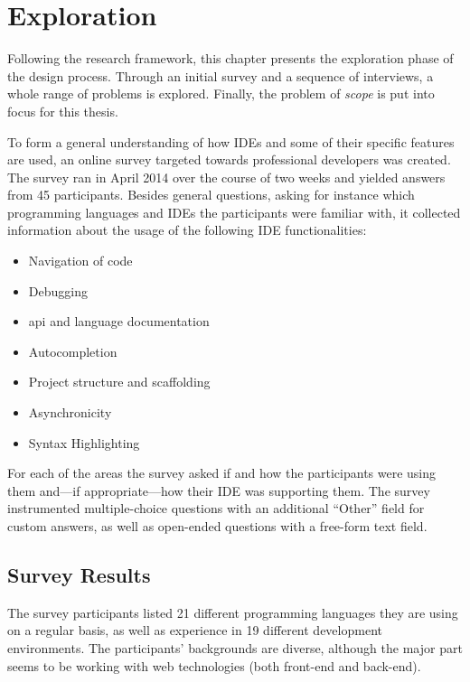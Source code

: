 \chapter{Exploration}\label{exploration}

Following the research framework, this chapter presents the exploration
phase of the design process. Through an initial survey and a sequence of
interviews, a whole range of problems is explored. Finally, the problem
of \emph{scope} is put into focus for this thesis.

To form a general understanding of how IDEs and some of their specific
features are used, an online survey targeted towards professional
developers was created. The survey ran in April 2014 over the course of
two weeks and yielded answers from 45 participants. Besides general
questions, asking for instance which programming languages and IDEs the
participants were familiar with, it collected information about the
usage of the following IDE functionalities:

\begin{itemize}
\itemsep1pt\parskip0pt
\item
  Navigation of code
\item
  Debugging
\item
  \ac{api} and language documentation
\item
  Autocompletion
\item
  Project structure and scaffolding
\item
  Asynchronicity
\item
  Syntax Highlighting
\end{itemize}

For each of the areas the survey asked if and how the participants were
using them and—if appropriate—how their IDE was supporting them. The
survey instrumented multiple-choice questions with an additional “Other”
field for custom answers, as well as open-ended questions with a
free-form text field.

\section{Survey Results}\label{survey-results}

The survey participants listed 21 different programming languages they
are using on a regular basis, as well as experience in 19 different
development environments. The participants’ backgrounds are diverse,
although the major part seems to be working with web technologies (both
front-end and back-end).

